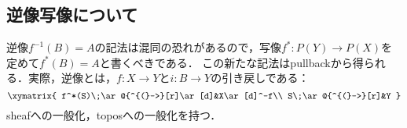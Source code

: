 \documentclass[uplatex,dvipdfmx]{jsreport}
\begin{document}
\subsection{逆像写像について}

\begin{tcolorbox}[colframe=ForestGreen, colback=ForestGreen!10!white, breakable ,colbacktitle=ForestGreen!40!white, coltitle=black,fonttitle=\bfseries\sffamily,
    title=逆像写像]
    逆像$f^{-1}(B)=A$の記法は混同の恐れがあるので，写像$f^*:P(Y)\to P(X)$を定めて$f^*(B)=A$と書くべきである．
    この新たな記法はpullbackから得られる．実際，逆像とは，$f:X\to Y$と$i:B\to Y$の引き戻しである：
    \[\xymatrix{
        f^*(S)\;\ar@{^{(}->}[r]\ar[d]&X\ar[d]^-f\\
        S\;\ar@{^{(}->}[r]&Y
    }\]
    sheafへの一般化，toposへの一般化を持つ．
\end{tcolorbox}
\end{document}
